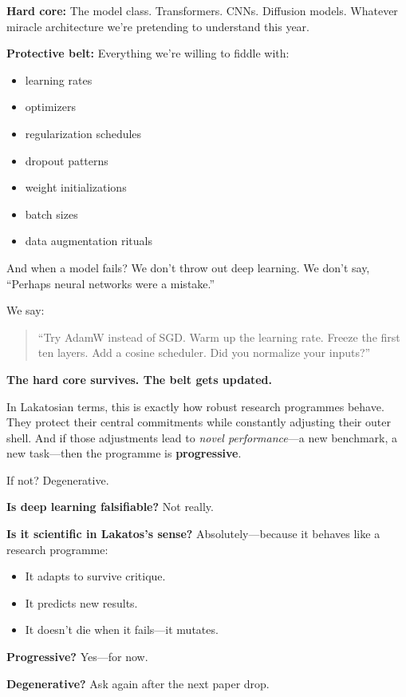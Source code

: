 \textbf{Hard core:} The model class. Transformers. CNNs. Diffusion models. Whatever miracle architecture we’re pretending to understand this year.

\textbf{Protective belt:} Everything we’re willing to fiddle with:
\begin{itemize}
  \item learning rates
  \item optimizers
  \item regularization schedules
  \item dropout patterns
  \item weight initializations
  \item batch sizes
  \item data augmentation rituals
\end{itemize}

And when a model fails? We don’t throw out deep learning.  
We don’t say, “Perhaps neural networks were a mistake.”

We say:
\begin{quote}
    “Try AdamW instead of SGD. Warm up the learning rate. Freeze the first ten layers. Add a cosine scheduler. Did you normalize your inputs?”
\end{quote}

\textbf{The hard core survives. The belt gets updated.}

In Lakatosian terms, this is exactly how robust research programmes behave. They protect their central commitments while constantly adjusting their outer shell. And if those adjustments lead to \textit{novel performance}—a new benchmark, a new task—then the programme is \textbf{progressive}.

If not? Degenerative.

\begin{tcolorbox}[colback=gray!5!white, colframe=black, title=\textbf{Sidebar: The Lakatosian Debugger}, fonttitle=\bfseries, arc=1.5mm, boxrule=0.4pt]
\textbf{Is deep learning falsifiable?}  
Not really.

\textbf{Is it scientific in Lakatos’s sense?}  
Absolutely—because it behaves like a research programme:
\begin{itemize}
  \item It adapts to survive critique.
  \item It predicts new results.
  \item It doesn’t die when it fails—it mutates.
\end{itemize}

\textbf{Progressive?} Yes—for now.

\textbf{Degenerative?} Ask again after the next paper drop.
\end{tcolorbox}

